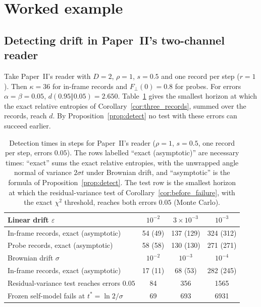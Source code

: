 \documentclass[12pt]{article}
\theoremstyle{definition}
\begin{document}
\section{Worked example}
\label{sec:example}

\subsection{Detecting drift in Paper~II's two-channel reader}
\label{subsec:example_detect}

Take Paper~II's reader with $D=2$, $\rho=1$, $s=0.5$ and one record per step ($r=1$). Then $\kappa=36$ for in-frame records and $F_\perp(0)=0.8$ for probes. For errors $\alpha=\beta=0.05$, $d(0.95\Vert0.05)=2.650$. Table~\ref{tab:detect} gives the smallest horizon at which the exact relative entropies of Corollary~\ref{cor:three_records}, summed over the records, reach $d$. By Proposition~\ref{prop:detect} no test with these errors can succeed earlier.

\begin{table}[t]
\centering
\small
\begin{tabular}{lccc}
\toprule
Linear drift $\varepsilon$ & $10^{-2}$ & $3\times10^{-3}$ & $10^{-3}$\\
\midrule
In-frame records, exact (asymptotic) & 54 (49) & 137 (129) & 324 (312)\\
Probe records, exact (asymptotic) & 58 (58) & 130 (130) & 271 (271)\\
\midrule
Brownian drift $\sigma$ & $10^{-2}$ & $10^{-3}$ & $10^{-4}$\\
\midrule
In-frame records, exact (asymptotic) & 17 (11) & 68 (53) & 282 (245)\\
Residual-variance test reaches errors $0.05$ & 84 & 356 & 1565\\
Frozen self-model fails at $t^*=\ln2/\sigma$ & 69 & 693 & 6931\\
\bottomrule
\end{tabular}
\caption{Detection times in steps for Paper~II's reader ($\rho=1$, $s=0.5$, one record per step, errors $0.05$). The rows labelled ``exact (asymptotic)'' are necessary times: ``exact'' sums the exact relative entropies, with the unwrapped angle normal of variance $2\sigma t$ under Brownian drift, and ``asymptotic'' is the formula of Proposition~\ref{prop:detect}. The test row is the smallest horizon at which the residual-variance test of Corollary~\ref{cor:before_failure}, with the exact $\chi^2$ threshold, reaches both errors $0.05$ (Monte Carlo).}
\label{tab:detect}
\end{table}
\end{document}
